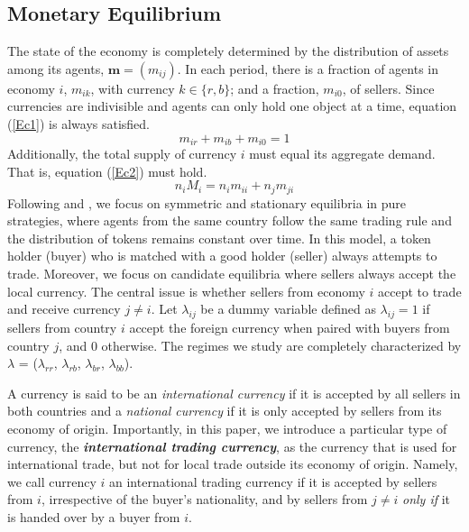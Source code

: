 \subsection{Monetary Equilibrium\label{MonetaryEquilibrium}}
The state of the economy is completely determined by the distribution of assets among its agents, $\textbf{m}=(m_{ij})$. In each period, there is a fraction of agents in economy $i$, $m_{ik}$, with currency $k \in \{r,b\}$; and a fraction, $m_{i0}$, of sellers. Since currencies are indivisible and agents can only hold one object at a time, equation (\ref{Ec1}) is always satisfied.
    \begin{equation}
        m_{ir}+m_{ib}+m_{i0}=1
        \label{Ec1}
    \end{equation}
Additionally, the total supply of currency $i$ must equal its aggregate demand. That is, equation (\ref{Ec2}) must hold.
    \begin{equation}
        n_{i}M_{i}=n_{i}m_{ii}+n_{j}m_{ji}
        \label{Ec2}
    \end{equation}
Following \cite{MKM} and \cite{JiangZhang}, we focus on symmetric and stationary equilibria in pure strategies, where agents from the same country follow the same trading rule and the distribution of tokens remains constant over time.  
In this model, a token holder (buyer) who is matched with a good holder (seller) always attempts to trade.  %
Moreover, we focus on candidate equilibria where sellers always accept the local currency. The central issue is whether sellers from economy $i$ accept to trade and receive currency $j \neq i$. Let $\lambda_{ij}$ be a dummy variable defined as $\lambda_{ij}=1$ if sellers from country $i$ accept the foreign currency when paired with buyers from country $j$, and 0 otherwise. The regimes we study are completely characterized by $\lambda$ = ($\lambda_{rr}$, $\lambda_{rb}$, $\lambda_{br}$, $\lambda_{bb}$).

A currency is said to be an \textit{international currency} if it is accepted by all sellers in both countries and a \textit{national currency} if it is only accepted by sellers from its economy of origin. Importantly, in this paper, we introduce a particular type of currency, the \textit{\textbf{international trading currency}}, as the currency that is used for international trade, but not for local trade outside its economy of origin. Namely, we call currency $i$ an international trading currency if it is accepted by sellers from $i$, irrespective of the buyer's nationality, and by sellers from $j \neq i$ \textit{only if} it is handed over by a buyer from $i$.

